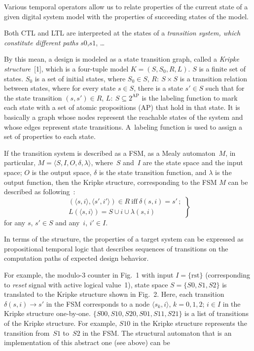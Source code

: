 \begin{multicols}{2}
Various temporal operators allow us to relate properties of the current state of a given digital 
system model with the properties of succeeding states of the model. 

Both CTL and LTL are interpreted at the states of a \textit{transition system, which constitute 
different  paths} $s0$,\linebreak $s1$, \ldots  
 
By this mean, a design is modeled as a state transition graph, called a \textit{Kripke 
structure}~[1], which is a four-tuple model $K =(S, S_0, R, L)$. $S$ is a finite set of 
states. $S_0$ is a set of initial states, where $S_0\in S$, $R:\ S\times S$ is a transition relation 
between states, where for every state $s\in S$, there is a state $s'\in S$ such that for the state 
transition $(s, s')\in R$, $L:\ S\subseteq 2^{\mathrm{AP}}$ is the labeling function to mark each state with a set 
of atomic propositions (AP) that hold in that state. It is basically a graph whose nodes represent 
the reachable states of the system and whose edges represent state transitions. A~labeling 
function is used to assign a set of properties to each state.

If the transition system is described as a FSM, as a Mealy automaton~$M$, in 
particular, $M=\langle S, I, O, \delta, \lambda\rangle$, 
where~$S$ and~$I$ are the state space and the input space; $O$ is the output space, $\delta$ is the state 
transition function, and $\lambda$ is the output function, then the Kripke structure, corresponding 
to the FSM $M$ can be described as following~\cite{12fr}:
\begin{equation}
\left.
\begin{array}{c}
 (\langle s, i\rangle,\langle s', i'\rangle)\in R\  
\mbox{iff}\ \delta (s,i)=s'\,;\\[6pt]
 L(\langle s,i\rangle )= S\cup i\cup \lambda (s,i)       
\end{array}
\right \}
\label{e1fr}
\end{equation}
for any $s$, $s' \in  S$ and any~$i$, $i'\in  I$.



In terms of the structure, the properties of a target system can be expressed as propositional 
temporal logic that describes sequences of transitions on the computation paths of expected 
design behavior.  

For example, the modulo-3 counter in Fig.~1 with input $I =\{\mathrm{rst}\}$ 
(corresponding to \textit{reset} signal with active logical value~1), state space $S=\{S0, S1, S2\}$  
is translated to the Kripke structure shown in Fig.~2. Here, each transition~$\delta(s, i) 
\rightarrow s'$ in the FSM corresponds to a node $\langle s_k, i \rangle$, $k=0, 1, 2$; $i \in I$ in the 
Kripke structure one-by-one. $\{S00,S10,S20,S01,S11,S21\}$ is a list of transitions of the Kripke 
structure. For example, $S10$ in the Kripke structure represents the transition from~$S1$ to~$S2$ in the 
FSM. The structural automaton that is an implementation of this abstract one (see above) can be\linebreak\vspace*{-12pt}
\pagebreak


\end{multicols}
